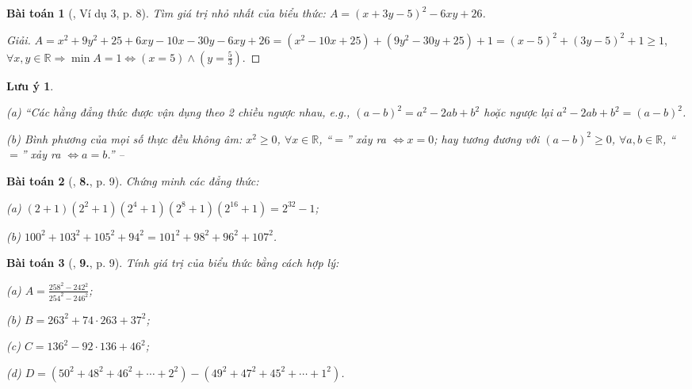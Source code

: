\documentclass{article}
\numberwithin{equation}{section}
\newtheorem{baitoan}{Bài toán}
\newtheorem{luuy}{Lưu ý}[section]
\begin{document}
\begin{baitoan}[\cite{Tuyen_Toan_8}, Ví dụ 3, p. 8]
	Tìm giá trị nhỏ nhất của biểu thức: $A = (x + 3y - 5)^2 - 6xy + 26$.
\end{baitoan}

\begin{proof}[Giải]
	$A = x^2 + 9y^2 + 25 + 6xy - 10x - 30y - 6xy + 26 = (x^2 - 10x + 25) + (9y^2 - 30y + 25) + 1 = (x - 5)^2 + (3y - 5)^2 + 1\ge 1$, $\forall x,y\in\mathbb{R}\Rightarrow\min A = 1\Leftrightarrow(x = 5)\land\left(y = \frac{5}{3}\right)$.
\end{proof}

\begin{luuy}
	\begin{enumerate*}
		\item[(a)] ``Các hằng đẳng thức được vận dụng theo 2 chiều ngược nhau, e.g., $(a - b)^2 = a^2 - 2ab + b^2$ hoặc ngược lại $a^2 - 2ab + b^2 = (a - b)^2$.
		\item[(b)] Bình phương của mọi số thực đều không âm: $x^2\ge 0$, $\forall x\in\mathbb{R}$, ``$=$'' xảy ra $\Leftrightarrow x = 0$; hay tương đương với $(a - b)^2\ge 0$, $\forall a,b\in\mathbb{R}$, ``$=$'' xảy ra $\Leftrightarrow a = b$.'' -- \cite[p. 9]{Tuyen_Toan_8}
	\end{enumerate*}
\end{luuy}

\begin{baitoan}[\cite{Tuyen_Toan_8}, \textbf{8.}, p. 9]
	Chứng minh các đẳng thức:
	\begin{enumerate*}
		\item[(a)] $(2 + 1)(2^2 + 1)(2^4 + 1)(2^8 + 1)(2^{16} + 1) = 2^{32} - 1$;
		\item[(b)] $100^2 + 103^2 + 105^2 + 94^2 = 101^2 + 98^2 + 96^2 + 107^2$.
	\end{enumerate*}
\end{baitoan}

\begin{baitoan}[\cite{Tuyen_Toan_8}, \textbf{9.}, p. 9]
	Tính giá trị của biểu thức bằng cách hợp lý:
	\begin{enumerate*}
		\item[(a)] $A = \frac{258^2 - 242^2}{254^2 - 246^2}$;
		\item[(b)] $B = 263^2 + 74\cdot263 + 37^2$;
		\item[(c)] $C = 136^2 - 92\cdot136 + 46^2$;
		\item[(d)] $D = (50^2 + 48^2 + 46^2 + \cdots + 2^2) - (49^2 + 47^2 + 45^2 + \cdots + 1^2)$.
	\end{enumerate*}
\end{baitoan}
\end{document}
